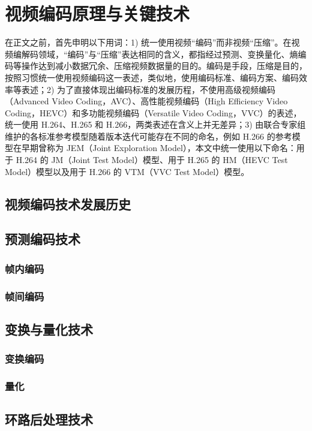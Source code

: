 \chapter{视频编码原理与关键技术}
\label{cha:c2}
在正文之前，首先申明以下用词：1) 统一使用视频“编码”而非视频“压缩”。在视频编解码领域，“编码”与“压缩”表达相同的含义，都指经过预测、变换量化、熵编码等操作达到减小数据冗余、压缩视频数据量的目的。编码是手段，压缩是目的，按照习惯统一使用视频编码这一表述，类似地，使用编码标准、编码方案、编码效率等表述；2) 为了直接体现出编码标准的发展历程，不使用高级视频编码（Advanced Video Coding，AVC）、高性能视频编码（High Efficiency Video Coding，HEVC）和多功能视频编码（Versatile Video Coding，VVC）的表述，统一使用 H.264、H.265 和 H.266，两类表述在含义上并无差异；3) 由联合专家组维护的各标准参考模型随着版本迭代可能存在不同的命名，例如 H.266 的参考模型在早期曾称为 JEM（Joint Exploration Model），本文中统一使用以下命名：用于 H.264 的 JM（Joint Test Model）模型、用于 H.265 的 HM（HEVC Test Model）模型以及用于 H.266 的 VTM（VVC Test Model）模型。

\section{视频编码技术发展历史}

\section{预测编码技术}
\subsection{帧内编码}
\subsection{帧间编码}

\section{变换与量化技术}
\subsection{变换编码}
\subsection{量化}

\section{环路后处理技术}
